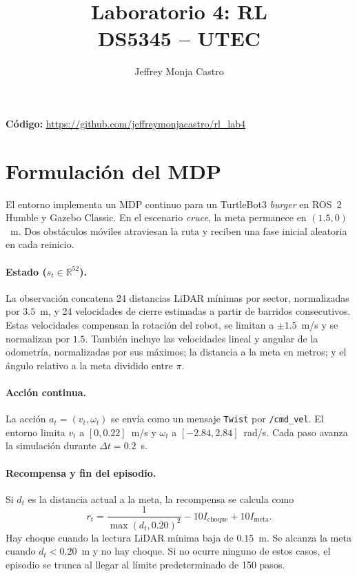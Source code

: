 \documentclass[11pt,a4paper]{article}
\title{Laboratorio 4: RL\\\large DS5345 -- UTEC}
\author{Jeffrey Monja Castro} %
\begin{document}
\maketitle

\noindent\textbf{Código:} \url{https://github.com/jeffreymonjacastro/rl_lab4}\\


\section{Formulación del MDP}
El entorno implementa un MDP continuo para un TurtleBot3 \emph{burger} en ROS~2 Humble y Gazebo Classic. En el escenario \emph{cruce}, la meta permanece en $(1.5,0)$~m. Dos obstáculos móviles atraviesan la ruta y reciben una fase inicial aleatoria en cada reinicio.

\paragraph{Estado ($s_t \in \mathbb{R}^{52}$).} La observación concatena 24 distancias LiDAR mínimas por sector, normalizadas por $3.5$~m, y 24 velocidades de cierre estimadas a partir de barridos consecutivos. Estas velocidades compensan la rotación del robot, se limitan a $\pm1.5$~m/s y se normalizan por $1.5$. También incluye las velocidades lineal y angular de la odometría, normalizadas por sus máximos; la distancia a la meta en metros; y el ángulo relativo a la meta dividido entre $\pi$.

\paragraph{Acción continua.} La acción $a_t=(v_t,\omega_t)$ se envía como un mensaje \texttt{Twist} por \texttt{/cmd\_vel}. El entorno limita $v_t$ a $[0,0.22]$~m/s y $\omega_t$ a $[-2.84,2.84]$~rad/s. Cada paso avanza la simulación durante $\Delta t=0.2$~s.

\paragraph{Recompensa y fin del episodio.} Si $d_t$ es la distancia actual a la meta, la recompensa se calcula como
\[
    r_t = \frac{1}{\max(d_t,0.20)^2} - 10 I_{\text{choque}} + 10 I_{\text{meta}}.
\]
Hay choque cuando la lectura LiDAR mínima baja de $0.15$~m. Se alcanza la meta cuando $d_t<0.20$~m y no hay choque. Si no ocurre ninguno de estos casos, el episodio se trunca al llegar al límite predeterminado de 150 pasos.
\end{document}
